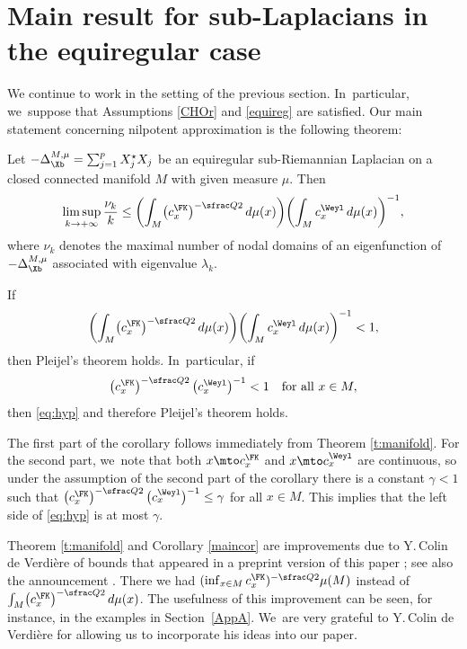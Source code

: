 \section{Main result for sub-Laplacians in the equiregular case}\label{sec:mainsubriem}

We continue to work in the setting of the previous section. In~particular, we~suppose that Assumptions \ref{CHOr} and \ref{equireg} are satisfied. Our main statement concerning nilpotent approximation is the following theorem:

\begin{theorem}\label{t:manifold}
Let $-\Delta_\Xb^{M,\mu} =\sum_{j=1}^p X_j^\star X_j$ be an equiregular sub-Riemannian Laplacian on a closed connected manifold $M$ with given measure $\mu$. Then
\begin{equation}\label{eq:mainmfd}
\limsup_{k\to+\infty} \frac{\nu_k}{k} \leq \biggl(\int_M \bigl(c^\FK_x \bigr)^{-\sfrac Q2} \,d\mu(x) \biggr) \biggl(\int_M c_x^\Weyl \,d\mu(x) \biggr)^{-1},
\end{equation}
where $\nu_k$ denotes the maximal number of nodal domains of an eigenfunction of $-\Delta_\Xb^{M,\mu}$ associated with eigenvalue $\lambda_k$.
\end{theorem}

\begin{corollary}\label{maincor}
If
\begin{equation}\label{eq:hyp}
\biggl(\int_M \bigl(c^\FK_x \bigr)^{-\sfrac Q2} \,d\mu(x) \biggr) \biggl(\int_M c_x^\Weyl \,d\mu(x) \biggr)^{-1} < 1,
\end{equation}
then Pleijel's theorem holds. In~particular, if
\[
\bigl(c^\FK_x \bigr)^{-\sfrac Q2} \,\bigl(c_x^\Weyl \bigr)^{-1} < 1
\quad\text{for all}\ x\in M,
\]
then \eqref{eq:hyp} and therefore Pleijel's theorem holds.
\end{corollary}

The first part of the corollary follows immediately from Theorem \ref{t:manifold}. For the second part, we~note that both $x\mto c^\FK_x$ and $x\mto c_x^\Weyl$ are continuous, so under the assumption of the second part of the corollary there is a constant $\gamma<1$ such that $\bigl(c^\FK_x \bigr)^{-\sfrac Q2} \,\bigl(c_x^\Weyl \bigr)^{-1}\leq\gamma$ for all $x\in M$. This implies that the left side of \eqref{eq:hyp} is at most $\gamma$.

Theorem \ref{t:manifold} and Corollary \ref{maincor} are improvements due to Y.\,Colin de Verdière of bounds that appeared in a preprint version of this paper \cite{FrHe1}; see also the announcement \cite{FrHe2}. There we had $(\inf_{x\in M} c_x^\FK)^{-\sfrac Q2} \mu(M)$ instead of $\int_M \bigl(c^\FK_x \bigr)^{-\sfrac Q2} \,d\mu(x)$. The usefulness of this improvement can be seen, for instance, in the examples in Section~\ref{AppA}. We~are very grateful to Y.\,Colin de Verdière for allowing us to incorporate his ideas into our paper.

